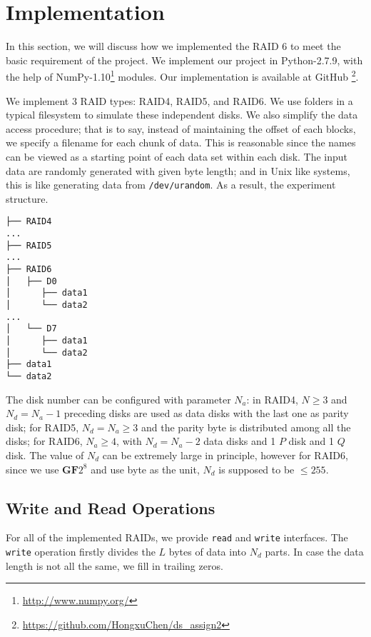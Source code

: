 \section{Implementation}

In this section, we will discuss how we implemented the RAID 6 to meet the basic requirement of the project.
We implement our project in Python-2.7.9, with the help of NumPy-1.10\footnote{\url{http://www.numpy.org/}} modules. Our implementation is available at GitHub \footnote{\url{https://github.com/HongxuChen/ds_assign2}}.

We implement 3 RAID types: RAID4, RAID5, and RAID6. We use folders in a typical filesystem to simulate these independent disks. We also simplify the data access procedure; that is to say, instead of maintaining the offset of each blocks, we specify a filename for each chunk of data. This is reasonable since the names can be viewed as a starting point of each data set within each disk. The input data are randomly generated with given byte length; and in Unix like systems, this is like generating data from \verb|/dev/urandom|. As a result, the experiment structure.

\begin{verbatim}
├── RAID4
...
├── RAID5
...
├── RAID6
│   ├── D0
│      ├── data1
│      └── data2
...
│   └── D7
│      ├── data1
│      └── data2
├── data1
└── data2

\end{verbatim}

The disk number can be configured with parameter $N_{a}$: in RAID4, $N\ge 3$ and $N_{d}=N_{a}-1$ preceding disks are used as data disks with the last one as parity disk; for RAID5, $N_{d}=N_{a}\ge 3$ and the parity byte is distributed among all the disks;  for RAID6, $N_{a}\ge 4$, with $N_{d}=N_{a}-2$ data disks and 1 $P$ disk and 1 $Q$ disk. The value of $N_{d}$ can be extremely large in principle, however for RAID6, since we use $\mathbf{GF}2^8$ and use byte as the unit, $N_{d}$ is supposed to be $\le 255$.

\subsection{Write and Read Operations}

For all of the implemented RAIDs, we provide \verb|read| and \verb|write| interfaces. The \verb|write| operation firstly divides the $L$ bytes of data into $N_d$ parts. In case the data length is not all the same, we fill in trailing zeros. 

